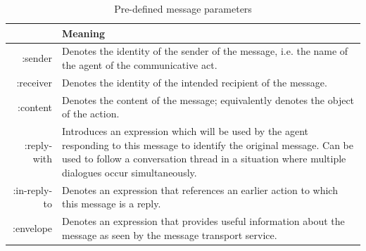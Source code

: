 \documentclass[main.tex]{subfiles}
\begin{document}
\begin{table}[htbp]
    \footnotesize
    \renewcommand{\arraystretch}{1.8}
    \caption{Pre-defined message parameters \cite{IntelligentPhysicalAgents2001}}
    \centering\begin{tabularx}{.8\textwidth}{>{\ttfamily}rX}
        \toprule
        \multicolumn{1}{p{8em}}{\bf \centering Message \newline Parameter} & \bf \centering Meaning \arraybackslash                \\\midrule
        :sender                                                            & Denotes the identity of the sender of the message,
                                                                            i.e. the name of the agent of the communicative act. \\\midrule
        :receiver                                                          & Denotes the identity of the intended recipient of the
                                                                            message. \\\midrule
        :content                                                           & Denotes the content of the message; equivalently
                                                                            denotes the object of the action. \\\midrule
        :reply-with                                                        & Introduces an expression which will be used by the
                                                                            agent responding to this message to identify the
                                                                            original message. Can be used to follow a
                                                                            conversation thread in a situation where multiple
                                                                            dialogues occur simultaneously. \\\midrule
        :in-reply-to                                                       & Denotes an expression that references an earlier
                                                                            action to which this message is a reply. \\\midrule
        :envelope                                                          & Denotes an expression that provides useful
                                                                            information about the message as seen by the
                                                                            message transport service. \\\midrule

\end{tabularx}
\end{table}
\end{document}
